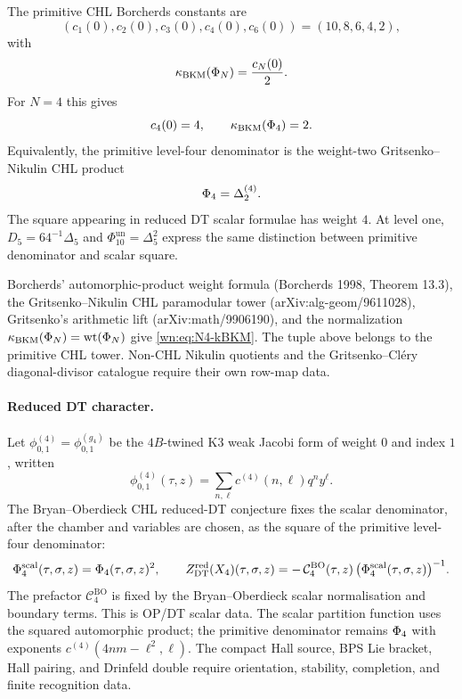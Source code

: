 The primitive CHL Borcherds constants are
\[
  (c_1(0),c_2(0),c_3(0),c_4(0),c_6(0))
  =(10,8,6,4,2),
\]
with
\[
  \kappa_{\mathrm{BKM}}(\Phi_N)=\frac{c_N(0)}{2}.
\]
For $N=4$ this gives
\begin{equation}
  c_4(0)=4,\qquad
  \kappa_{\mathrm{BKM}}(\Phi_4)=2 .
  \label{wn:eq:N4-kBKM}
\end{equation}
Equivalently, the primitive level-four denominator is the weight-two
Gritsenko--Nikulin CHL product
\[
  \Phi_4=\Delta^{(4)}_2 .
\]
The square appearing in reduced DT scalar formulae has weight $4$.
At level one, $D_5=64^{-1}\Delta_5$ and
$\Phi_{10}^{\mathrm{un}}=\Delta_5^2$ express the same distinction
between primitive denominator and scalar square.

Borcherds' automorphic-product weight formula (Borcherds 1998,
Theorem 13.3), the Gritsenko--Nikulin CHL paramodular tower
(arXiv:alg-geom/9611028), Gritsenko's arithmetic lift
(arXiv:math/9906190), and the normalization
$\kappa_{\mathrm{BKM}}(\Phi_N)=\mathrm{wt}(\Phi_N)$ give \eqref{wn:eq:N4-kBKM}.
The tuple above belongs to the primitive CHL tower.  Non-CHL Nikulin
quotients and the Gritsenko--Cl\'ery diagonal-divisor catalogue require
their own row-map data.

\paragraph{Reduced DT character.}
Let $\phi^{(4)}_{0,1}=\phi^{(g_4)}_{0,1}$ be the $4B$-twined K3 weak
Jacobi form of weight $0$ and index $1$, written
\[
  \phi^{(4)}_{0,1}(\tau,z)=
  \sum_{n,\ell} c^{(4)}(n,\ell)q^n y^\ell .
\]
The Bryan--Oberdieck CHL reduced-DT conjecture fixes the scalar
denominator, after the chamber and variables are chosen, as the square
of the primitive level-four denominator:
\begin{equation}
  \Phi^{\mathrm{scal}}_4(\tau,\sigma,z)
  =
  \Phi_4(\tau,\sigma,z)^2,
  \qquad
  Z^{\mathrm{red}}_{\mathrm{DT}}(X_4)(\tau,\sigma,z)
  =
  -\,\mathcal C^{\mathrm{BO}}_4(\tau,z)\,
  \bigl(\Phi^{\mathrm{scal}}_4(\tau,\sigma,z)\bigr)^{-1}.
  \label{wn:eq:N4-DTred}
\end{equation}
The prefactor $\mathcal C^{\mathrm{BO}}_4$ is fixed by the
Bryan--Oberdieck scalar normalisation and boundary terms.  This is OP/DT
scalar data.  The scalar partition function uses the squared
automorphic product; the primitive denominator remains $\Phi_4$ with
exponents $c^{(4)}(4nm-\ell^2,\ell)$.  The compact Hall source, BPS Lie
bracket, Hall pairing, and Drinfeld double require orientation,
stability, completion, and finite recognition data.

